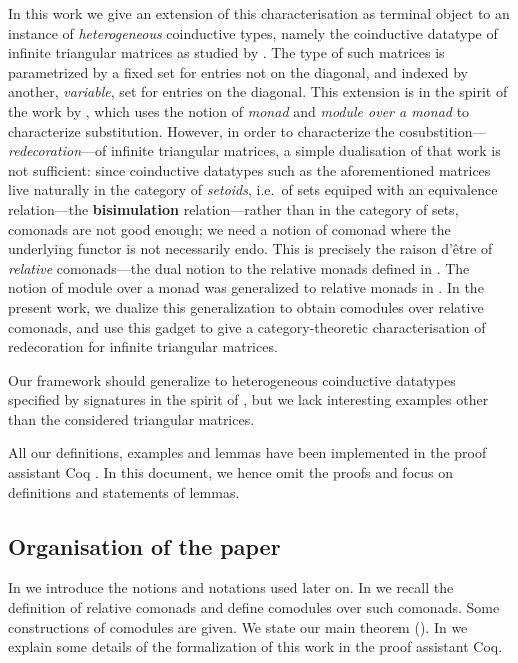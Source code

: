 \documentclass{amsart}
\newcommand{\fat}[1]{\textbf{#1}}
\begin{document}
 In this work we give an extension of this characterisation as terminal object to an instance of \emph{heterogeneous} coinductive types,
 namely the coinductive datatype of infinite triangular matrices as studied by
 \textcite{DBLP:conf/types/MatthesP11}. 
 The type of such matrices is parametrized by a fixed set for entries not on the diagonal, and indexed by another, \emph{variable}, set for entries on 
 the diagonal.
 This extension is in the spirit of the work by \textcite{DBLP:journals/iandc/HirschowitzM10}, which uses the notion of \emph{monad} and
 \emph{module over a monad} to characterize substitution.
 However, in order to characterize the cosubstition---\emph{redecoration}---of infinite triangular matrices, 
 a simple dualisation of that work is not sufficient: since coinductive datatypes such as the aforementioned matrices 
 live naturally in the category of 
 \emph{setoids}, i.e.\ of sets equiped with an equivalence relation---the \fat{bisimulation} relation---rather than in the category of sets,
 comonads are not good enough; we need a notion of comonad where the underlying functor is not necessarily endo.
 This is precisely the raison d'\^etre of \emph{relative} comonads---the dual notion to the relative monads defined in 
  \parencite{DBLP:conf/fossacs/AltenkirchCU10}. 
 The notion of module over a monad was generalized to relative monads in \parencite{ahrens_relmonads}.
 In the present work, we dualize this generalization to obtain comodules over relative comonads, and use this gadget to 
 give a category-theoretic characterisation of redecoration for infinite triangular matrices.
 
 Our framework should generalize to heterogeneous coinductive datatypes specified by signatures in the spirit of \parencite{ahrens_relmonads},
 but we lack interesting examples other than the considered triangular matrices.
 
 All our definitions, examples and lemmas have been implemented in the proof assistant \textsf{Coq} \parencite{coq}.
 In this document, we hence omit the proofs and focus on definitions and statements of lemmas.
 
\subsection*{Organisation of the paper}
  In  we introduce the notions and notations used later on.
  In  we recall the definition of relative comonads and define comodules over such comonads.
  Some constructions of comodules are given.
  We state our main theorem ().
  In  we explain some details of the formalization of this work in the proof assistant \textsf{Coq}.
 
\end{document}
